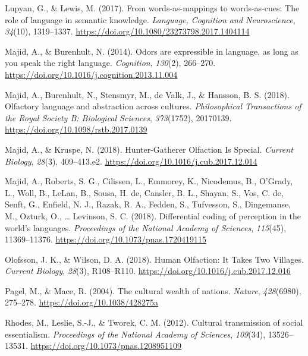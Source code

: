 \documentclass[11pt,man]{article}
\newlength{\cslhangindent}
\newenvironment{cslreferences}%
  {\setlength{\parindent}{0pt}%
  \everypar{\setlength{\hangindent}{\cslhangindent}}\ignorespaces}%
  {\par}
\begin{document}
\begin{cslreferences}
\leavevmode\hypertarget{ref-lupyan_words-as-mappings_2017}{}%
Lupyan, G., \& Lewis, M. (2017). From words-as-mappings to
words-as-cues: The role of language in semantic knowledge.
\emph{Language, Cognition and Neuroscience}, \emph{34}(10), 1319--1337.
\url{https://doi.org/10.1080/23273798.2017.1404114}

\leavevmode\hypertarget{ref-majid_odors_2014}{}%
Majid, A., \& Burenhult, N. (2014). Odors are expressible in language,
as long as you speak the right language. \emph{Cognition},
\emph{130}(2), 266--270.
\url{https://doi.org/10.1016/j.cognition.2013.11.004}

\leavevmode\hypertarget{ref-majid_olfactory_2018}{}%
Majid, A., Burenhult, N., Stensmyr, M., de Valk, J., \& Hansson, B. S.
(2018). Olfactory language and abstraction across cultures.
\emph{Philosophical Transactions of the Royal Society B: Biological
Sciences}, \emph{373}(1752), 20170139.
\url{https://doi.org/10.1098/rstb.2017.0139}

\leavevmode\hypertarget{ref-majid_hunter-gatherer_2018}{}%
Majid, A., \& Kruspe, N. (2018). Hunter-Gatherer Olfaction Is Special.
\emph{Current Biology}, \emph{28}(3), 409--413.e2.
\url{https://doi.org/10.1016/j.cub.2017.12.014}

\leavevmode\hypertarget{ref-majid_differential_2018}{}%
Majid, A., Roberts, S. G., Cilissen, L., Emmorey, K., Nicodemus, B.,
O'Grady, L., Woll, B., LeLan, B., Sousa, H. de, Cansler, B. L., Shayan,
S., Vos, C. de, Senft, G., Enfield, N. J., Razak, R. A., Fedden, S.,
Tufvesson, S., Dingemanse, M., Ozturk, O., \ldots{} Levinson, S. C.
(2018). Differential coding of perception in the world's languages.
\emph{Proceedings of the National Academy of Sciences}, \emph{115}(45),
11369--11376. \url{https://doi.org/10.1073/pnas.1720419115}

\leavevmode\hypertarget{ref-olofsson_human_2018}{}%
Olofsson, J. K., \& Wilson, D. A. (2018). Human Olfaction: It Takes Two
Villages. \emph{Current Biology}, \emph{28}(3), R108--R110.
\url{https://doi.org/10.1016/j.cub.2017.12.016}

\leavevmode\hypertarget{ref-pagel_cultural_2004}{}%
Pagel, M., \& Mace, R. (2004). The cultural wealth of nations.
\emph{Nature}, \emph{428}(6980), 275--278.
\url{https://doi.org/10.1038/428275a}

\leavevmode\hypertarget{ref-rhodes_cultural_2012}{}%
Rhodes, M., Leslie, S.-J., \& Tworek, C. M. (2012). Cultural
transmission of social essentialism. \emph{Proceedings of the National
Academy of Sciences}, \emph{109}(34), 13526--13531.
\url{https://doi.org/10.1073/pnas.1208951109}


\end{cslreferences}
\end{document}
